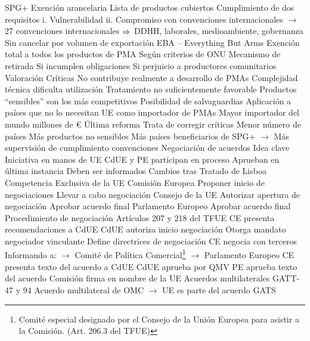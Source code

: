\documentclass{nuevotema}
\begin{document}
\begin{esquemal}
			\3 SPG+
				\4 Exención arancelaria
				\4[] Lista de productos cubiertos
				\4 Cumplimiento de dos requisitos
				\4[] i. Vulnerabilidad
				\4[] ii. Compromiso con convenciones internacionales
				\4[] $\to$ 27 convenciones internacionales
				\4[] $\Rightarrow$ DDHH, laborales, medioambiente, gobernanza
				\4 Sin cancelar por volumen de exportación
			\3 EBA -- Everything But Arms
				\4 Exención total a todos los productos de PMA
				\4[] Según criterios de ONU
				\4 Mecanismo de retirada
				\4[] Si incumplen obligaciones
				\4[] Si perjuicio a productores comunitarios
			\3 Valoración
				\4 Críticas
				\4[] No contribuye realmente a desarrollo de PMAs
				\4[] Complejidad técnica dificulta utilización
				\4[] Tratamiento no suficientemente favorable
				\4[] Productos ``sensibles'' son los más competitivos
				\4[] Posibilidad de salvaguardias
				\4[] Aplicación a países que no lo necesitan
				\4 UE como importador de PMAs
				\4[] Mayor importador del mundo
				 millones de €
				\4 Última reforma
				\4[] Trata de corregir críticas
				\4[] Menor número de países
				\4[] Más productos no sensibles
				\4[] Más países beneficiarios de SPG+
				\4[] $\to$ Más supervisión de cumplimiento convenciones
	\1 
		\2 Negociación de acuerdos
			\3 Idea clave
				\4 Iniciativa en manos de UE
				\4 CdUE y PE participan en proceso
				\4[] Aprueban en última instancia
				\4[] Deben ser informados
				\4 Cambios tras Tratado de Lisboa
			\3 Competencia
				\4 Exclusiva de la UE
				\4 Comisión Europea
				\4[] Proponer inicio de negociaciones
				\4[] Llevar a cabo negociación
				\4 Consejo de la UE
				\4[] Autorizar apertura de negociación
				\4[] Aprobar acuerdo final
				\4 Parlamento Europeo
				\4[] Aprobar acuerdo final
			\3 Procedimiento de negociación
				\4 Artículos 207 y 218 del TFUE
				\4[1] CE presenta recomendaciones a CdUE
				\4[2] CdUE autoriza inicio negociación
				\4[] Otorga mandato negociador vinculante
				\4[] Define directrices de negociación
				\4[3] CE negocia con terceros
				\4[] Informando a:
				\4[] $\to$ Comité de Política Comercial\footnote{Comité especial designado por el Consejo de la Unión Europea para asistir a la Comisión. (Art. 206.3 del TFUE)}
				\4[] $\to$ Parlamento Europeo
				\4[4] CE presenta texto del acuerdo a CdUE
				\4[] CdUE aprueba por QMV
				\4[5] PE aprueba texto del acuerdo
				\4[6] Comisión firma en nombre de la UE
		\2 Acuerdos multilaterales
			\3 GATT-47 y 94
				\4 Acuerdo multilateral de OMC
				\4[] $\to$ UE es parte del acuerdo
			\3 GATS

\end{esquemal}
\end{document}

